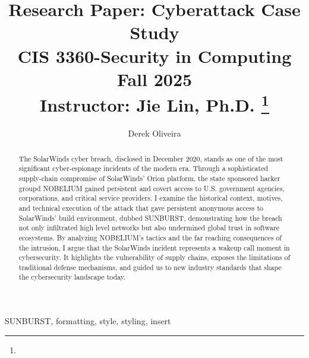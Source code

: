 \documentclass[conference]{IEEEtran}
\begin{document}
\title{Research Paper: Cyberattack Case Study \\CIS 3360-Security in Computing\\Fall 2025\\
{\footnotesize Instructor: Jie Lin, Ph.D.}
\thanks{}
}

\author{{ Derek Oliveira}\\
}

\maketitle

\begin{abstract}
The SolarWinds cyber breach, disclosed in December 2020, stands as one of the most significant cyber-espionage
incidents of the modern era. Through a sophisticated supply-chain compromise of SolarWinds' Orion platform, 
the state sponsored hacker groupd NOBELIUM gained persistent and covert access to U.S. government agencies,
corporations, and critical service providers. I examine the historical context, motives, and technical execution
of the attack that gave persistent anonymous access to SolarWinds' build environment, dubbed SUNBURST, demonstrating how the breach not 
only infiltrated high level networks but also undermined global trust in software ecosystems. By analyzing
NOBELIUM's tactics and the far reaching consequences of the intrusion, I argue that the SolarWinds incident
represents a wakeup call moment in cybersecurity. It highlights the vulnerability of supply chains, exposes
the limitations of traditional defense mechanisms, and guided us to new industry standards that shape the cybersecurity
landscape today. 
\end{abstract}

\begin{IEEEkeywords}
SUNBURST, formatting, style, styling, insert
\end{IEEEkeywords}
\end{document}
